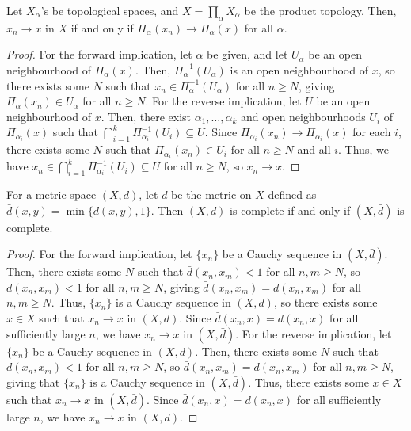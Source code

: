 \begin{lemma}
    Let $X_{\alpha}$'s be topological spaces, and $X = \prod_{\alpha} X_{\alpha}$ be the product topology. Then, $x_{n} \to x$ in $X$ if and only if $\Pi_{\alpha}(x_{n}) \to \Pi_{\alpha}(x)$ for all $\alpha$.
\end{lemma}
\begin{proof}
    For the forward implication, let $\alpha$ be given, and let $U_{\alpha}$ be an open neighbourhood of $\Pi_{\alpha}(x)$. Then, $\Pi_{\alpha}^{-1}(U_{\alpha})$ is an open neighbourhood of $x$, so there exists some $N$ such that $x_{n} \in \Pi_{\alpha}^{-1}(U_{\alpha})$ for all $n \geq N$, giving $\Pi_{\alpha}(x_{n}) \in U_{\alpha}$ for all $n \geq N$. For the reverse implication, let $U$ be an open neighbourhood of $x$. Then, there exist $\alpha_{1},\ldots,\alpha_{k}$ and open neighbourhoods $U_{i}$ of $\Pi_{\alpha_{i}}(x)$ such that $\bigcap_{i=1}^{k} \Pi_{\alpha_{i}}^{-1}(U_{i}) \subseteq U$. Since $\Pi_{\alpha_{i}}(x_{n}) \to \Pi_{\alpha_{i}}(x)$ for each $i$, there exists some $N$ such that $\Pi_{\alpha_{i}}(x_{n}) \in U_{i}$ for all $n \geq N$ and all $i$. Thus, we have $x_{n} \in \bigcap_{i=1}^{k} \Pi_{\alpha_{i}}^{-1}(U_{i}) \subseteq U$ for all $n \geq N$, so $x_{n} \to x$.
\end{proof}

\begin{proposition}
    For a metric space $(X,d)$, let $\bar{d}$ be the metric on $X$ defined as $\bar{d}(x,y) = \min\{d(x,y),1\}$. Then $(X,d)$ is complete if and only if $(X,\bar{d})$ is complete.
\end{proposition}
\begin{proof}
    For the forward implication, let $\{x_{n}\}$ be a Cauchy sequence in $(X,\bar{d})$. Then, there exists some $N$ such that $\bar{d}(x_{n},x_{m}) < 1$ for all $n,m \geq N$, so $d(x_{n},x_{m}) < 1$ for all $n,m \geq N$, giving $\bar{d}(x_{n},x_{m}) = d(x_{n},x_{m})$ for all $n,m \geq N$. Thus, $\{x_{n}\}$ is a Cauchy sequence in $(X,d)$, so there exists some $x \in X$ such that $x_{n} \to x$ in $(X,d)$. Since $\bar{d}(x_{n},x) = d(x_{n},x)$ for all sufficiently large $n$, we have $x_{n} \to x$ in $(X,\bar{d})$. For the reverse implication, let $\{x_{n}\}$ be a Cauchy sequence in $(X,d)$. Then, there exists some $N$ such that $d(x_{n},x_{m}) < 1$ for all $n,m \geq N$, so $\bar{d}(x_{n},x_{m}) = d(x_{n},x_{m})$ for all $n,m \geq N$, giving that $\{x_{n}\}$ is a Cauchy sequence in $(X,\bar{d})$. Thus, there exists some $x \in X$ such that $x_{n} \to x$ in $(X,\bar{d})$. Since $\bar{d}(x_{n},x) = d(x_{n},x)$ for all sufficiently large $n$, we have $x_{n} \to x$ in $(X,d)$.
\end{proof}

